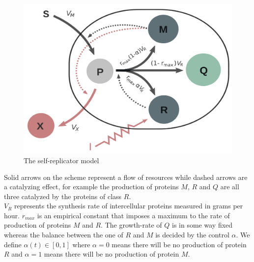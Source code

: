 \documentclass{tudelft-report}
\begin{document}
\begin{figure}[H]
 \centering
 \includegraphics[scale=0.13]{figures/modele.png}
 \caption*{The self-replicator model}
\end{figure}\noindent
Solid arrows on the scheme represent a flow of resources while dashed arrows are a catalyzing effect, for example the production of proteins $M$, $R$ and $Q$ are all three catalyzed by the proteins of class $R$.\\ 
$V_R$ represents the synthesis rate of intercellular proteins measured in grams per hour. $r_{max}$ is an empirical constant that imposes a maximum to the rate of production of proteins $M$ and $R$. The growth-rate of $Q$ is in some way fixed whereas the balance between the one of $R$ and $M$ is decided by the control $\alpha$. We define $\alpha(t) \in [0,1]$ where $\alpha = 0$ means there will be no production of protein $R$ and $\alpha = 1$ means there will be no production of protein $M$.
\end{document}
